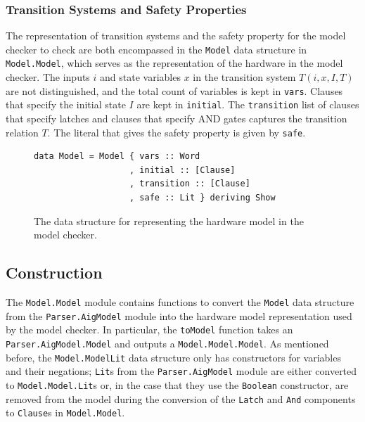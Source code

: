 \documentclass[12pt,a4paper,twoside,openright]{report}
\begin{document}
{\subsubsection{Transition Systems and Safety Properties}
The representation of transition systems and the safety property for the model checker to check
are both encompassed in the \verb,Model, data structure in \verb,Model.Model,, which serves
as the representation of the hardware in the model checker.
The inputs $i$ and state variables $x$ in the transition system $T(i,x,I,T)$
are not distinguished, and the total count of variables is kept in \verb,vars,.
Clauses that specify the initial state $I$ are kept in \verb,initial,.
The \verb,transition, list of clauses that specify latches and clauses that specify AND
gates captures the transition relation $T$.
The literal that gives the safety property is given by \verb,safe,.

\begin{figure}[!Ht]
\centering
\begin{lstlisting}
data Model = Model { vars :: Word
                   , initial :: [Clause]
                   , transition :: [Clause]
                   , safe :: Lit } deriving Show
\end{lstlisting}
\caption{The data structure for representing the hardware model in the model checker.}
\end{figure}

\subsection{Construction}

The \verb,Model.Model, module contains functions to convert the \verb,Model, data
structure from the \verb,Parser.AigModel, module into the hardware model representation used by
the model checker. In particular, the \verb,toModel, function takes an \verb,Parser.AigModel.Model,
and outputs a \verb,Model.Model.Model,. As mentioned before, the \verb,Model.ModelLit,
data structure only has constructors for variables and their negations; \verb,Lit,s from
the \verb,Parser.AigModel, module are either converted to \verb,Model.Model.Lit,s or, in the case
that they use the \verb,Boolean, constructor, are removed from the model during the conversion of
the \verb,Latch, and \verb,And, components to \verb,Clause,s in \verb,Model.Model,.

}
\end{document}

